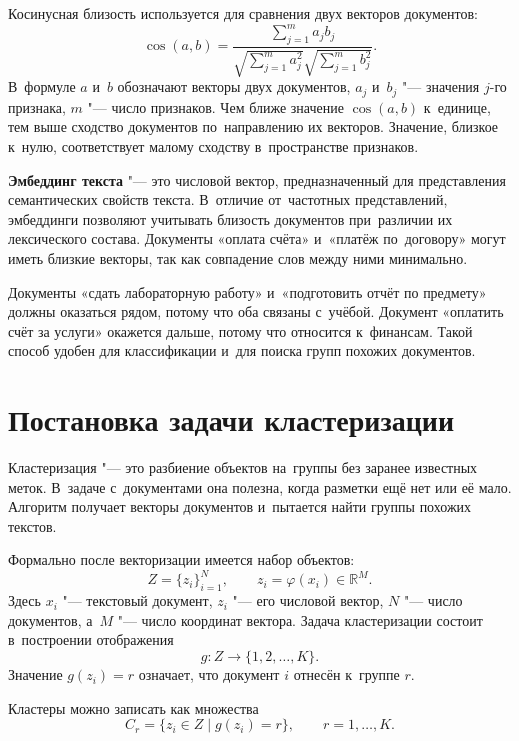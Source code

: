 Косинусная близость используется для сравнения двух векторов
документов:
\begin{equation}
    \label{eq:cosine}
    \cos(a,b) =
    \frac{\sum_{j=1}^{m} a_j b_j}
    {\sqrt{\sum_{j=1}^{m} a_j^2}\sqrt{\sum_{j=1}^{m} b_j^2}}.
\end{equation}
В~формуле \( a \) и~\( b \) обозначают векторы двух документов, \( a_j \)
и~\( b_j \) "--- значения \( j \)-го признака, \( m \) "--- число признаков.
Чем ближе значение \( \cos(a,b) \) к~единице, тем выше сходство документов
по~направлению их векторов. Значение, близкое к~нулю, соответствует малому
сходству в~пространстве признаков.

\textbf{Эмбеддинг текста} "--- это числовой вектор, предназначенный
для представления семантических свойств текста. В~отличие от~частотных
представлений, эмбеддинги позволяют учитывать близость документов при~различии
их лексического состава. Документы «оплата счёта» и~«платёж по~договору»
могут иметь близкие векторы, так как совпадение слов между ними минимально.

Документы «сдать лабораторную работу» и~«подготовить отчёт по предмету» должны
оказаться рядом, потому что оба связаны с~учёбой. Документ «оплатить счёт
за услуги» окажется дальше, потому что относится к~финансам. Такой способ
удобен для классификации и~для поиска групп похожих документов.

\section{Постановка задачи кластеризации}\label{sec:ch1/cluster}

Кластеризация "--- это разбиение объектов на~группы без заранее известных
меток. В~задаче с~документами она полезна, когда разметки ещё нет или её мало.
Алгоритм получает векторы документов и~пытается найти группы похожих текстов.

Формально после векторизации имеется набор объектов:
\[
    Z = \{z_i\}_{i=1}^{N}, \qquad z_i = \varphi(x_i) \in \mathbb{R}^{M}.
\]
Здесь \( x_i \) "--- текстовый документ, \( z_i \) "--- его числовой
вектор, \( N \) "--- число документов, а~\( M \) "--- число координат вектора.
Задача кластеризации состоит в~построении отображения
\[
    g: Z \rightarrow \{1, 2, \ldots, K\}.
\]
Значение \( g(z_i)=r \) означает, что документ \( i \) отнесён к~группе
\( r \).

Кластеры можно записать как множества
\[
    C_r = \{z_i \in Z \mid g(z_i)=r\}, \qquad r=1,\ldots,K.
\]

